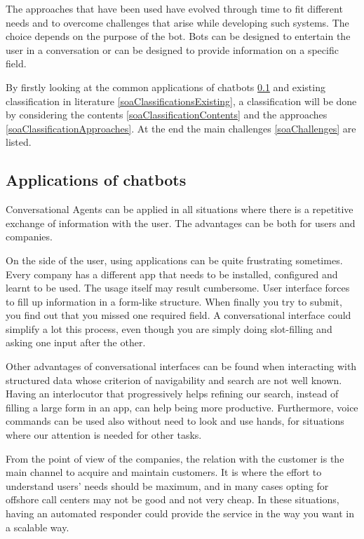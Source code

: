The approaches that have been used have evolved through time to fit different needs and to overcome challenges that arise while developing such systems. The choice depends on the purpose of the bot. Bots can be designed to entertain the user in a conversation or can be designed to provide information on a specific field.

By firstly looking at the common applications of chatbots \ref{soaApplications} and existing classification in literature \ref{soaClassificationsExisting}, a classification will be done by considering the contents \ref{soaClassificationContents} and the approaches \ref{soaClassificationApproaches}. At the end the main challenges \ref{soaChallenges} are listed.

\subsection{Applications of chatbots}
\label{soaApplications}

Conversational Agents can be applied in all situations where there is a repetitive exchange of information with the user. The advantages can be both for users and companies.

On the side of the user, using applications can be quite frustrating sometimes. Every company has a different app that needs to be installed, configured and learnt to be used. The usage itself may result cumbersome. User interface forces to fill up information in a form-like structure. When finally you try to submit, you find out that you missed one required field. A conversational interface could simplify a lot this process, even though you are simply doing slot-filling and asking one input after the other.

Other advantages of conversational interfaces can be found when interacting with structured data whose criterion of navigability and search are not well known. Having an interlocutor that progressively helps refining our search, instead of filling a large form in an app, can help being more productive. Furthermore, voice commands can be used also without need to look and use hands, for situations where our attention is needed for other tasks.

From the point of view of the companies, the relation with the customer is the main channel to acquire and maintain customers. It is where the effort to understand users' needs should be maximum, and in many cases opting for offshore call centers may not be good and not very cheap. In these situations, having an automated responder could provide the service in the way you want in a scalable way.

